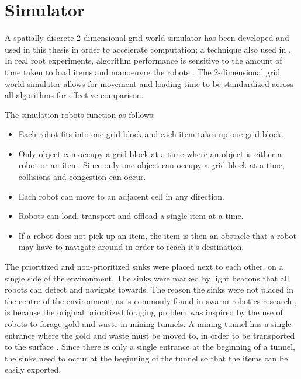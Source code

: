 \section{Simulator}
\label{simulator}
A spatially discrete 2-dimensional grid world simulator has been developed and used in this thesis in order to accelerate computation; a technique also used in \cite{sugawara2002swarming, hecker2015beyond}. In real root experiments, algorithm performance is sensitive to the amount of time taken to load items and manoeuvre the robots \cite{ostergaard2001emergent}. The 2-dimensional grid world simulator allows for movement and loading time to be standardized across all algorithms for effective comparison.

The simulation robots function as follows:
\begin{itemize}
	\item Each robot fits into one grid block and each item takes up one grid block. 
	\item Only object can occupy a grid block at a time where an object is either a robot or an item. Since only one object can occupy a grid block at a time, collisions and congestion can occur.
	\item Each robot can move to an adjacent cell in any direction.
	\item Robots can load, transport and offload a single item at a time.
	\item If a robot does not pick up an item, the item is then an obstacle that a robot may have to navigate around in order to reach it's destination.
\end{itemize}

The prioritized and non-prioritized sinks were placed next to each other, on a single side of the environment. The sinks were marked by light beacons that all robots can detect and navigate towards. The reason the sinks were not placed in the centre of the environment, as is commonly found in swarm robotics research \cite{labella2006division}, is because the original prioritized foraging problem was inspired by the use of robots to forage gold and waste in mining tunnels. A mining tunnel has a single entrance where the gold and waste must be moved to, in order to be transported to the surface \cite{brune2010extracting}. Since there is only a single entrance at the beginning of a tunnel, the sinks need to occur at the beginning of the tunnel so that the items can be easily exported.

